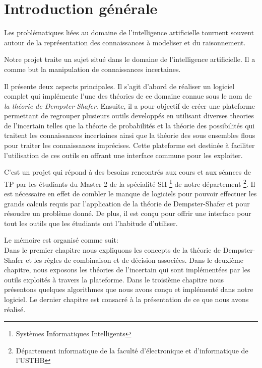 {}
\chapter*{Introduction générale}
Les problématiques liées au domaine de l'intelligence artificielle tournent souvent autour de la représentation
des connaissances à modeliser et du raisonnement.

Notre projet traite un sujet situé dans le domaine de l'intelligence artificielle. Il a comme but la
manipulation de connaissances incertaines.

Il présente deux aspects principales. Il s'agit d'abord de réaliser un logiciel complet qui implémente l'une des
théories de ce domaine connue sous le nom de \emph{la théorie de Dempster-Shafer}. Ensuite, il a pour objectif de
créer une plateforme permettant de regrouper plusieurs outils developpés en utilisant diverses theories de l'incertain
telles que la théorie de probabilités et la théorie des possibilités qui traitent les connaissances incertaines ainsi
que la théorie des sous ensembles flous pour traiter les connaissances imprécises. Cette plateforme est destinée à
faciliter l'utilisation de ces outils en offrant une interface commune pour les exploiter.

C'est un projet qui répond à des besoins rencontrés aux cours et aux séances de TP par les étudiants du Master 2 de la
spécialité SII \footnote{Systèmes Informatiques Intelligents} de notre département \footnote{Département informatique
de la faculté d'électronique et d'informatique de l'USTHB}. Il est nécessaire en effet de combler le manque de logiciels
pour pouvoir effectuer les grands calculs requis par l'application de la théorie de Dempster-Shafer et pour résoudre un
problème donné. De plus, il est conçu pour offrir une interface pour tout les outils que les étudiants ont l'habitude
d'utiliser.

Le mémoire est organisé comme suit:\\
Dans le premier chapitre nous expliquons les concepts de la théorie de Dempster-Shafer et les règles de combinaison
et de décision associées. Dans le deuxième chapitre, nous exposons les théories de l'incertain qui sont implémentées
par les outils exploités à travers la plateforme. Dans le troisième chapitre nous présentons quelques algorithmes que
nous avons conçu et implémenté dans notre logiciel. Le dernier chapitre est consacré à la présentation de ce que
nous avons réalisé.